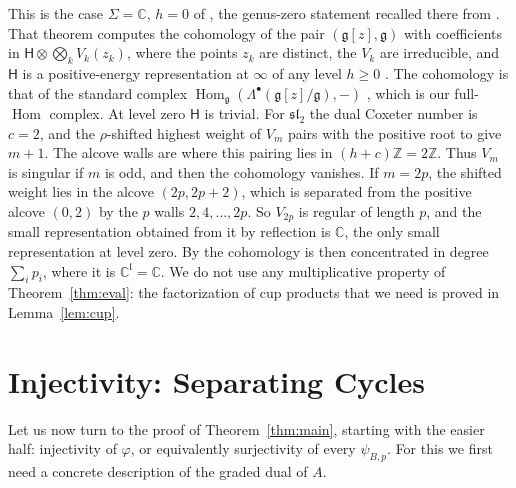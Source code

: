 \documentclass[11pt]{amsart}
\numberwithin{equation}{section}
\renewcommand{\S}{\mbox{$\mathsection$}}
\theoremstyle{definition}
\theoremstyle{remark}
\newcommand{\C}{\mathbb{C}}
\newcommand{\g}{\mathfrak{g}}
\newcommand{\sltwo}{\mathfrak{sl}_2}
\newcommand{\lie}{\mathfrak{l}}
\newcommand{\Hom}{\operatorname{Hom}}
\begin{document}
This is the case $\Sigma=\C$, $h=0$ of \cite[Theorem~3.1]{Tel96}, the genus-zero statement recalled there from \cite[\S1.4, Theorem~0]{Tel95}. That theorem computes the cohomology of the pair $(\g[z],\g)$ with coefficients in $\mathsf H\otimes\bigotimes_kV_k(z_k)$, where the points $z_k$ are distinct, the $V_k$ are irreducible, and $\mathsf H$ is a positive-energy representation at $\infty$ of any level $h\ge0$ \cite[\S1]{Tel96}. The cohomology is that of the standard complex $\Hom_\g(\Lambda^\bullet(\g[z]/\g),-)$ \cite[(3.1.4)]{Tel95}, which is our full-$\Hom$ complex. At level zero $\mathsf H$ is trivial. For $\sltwo$ the dual Coxeter number is $c=2$, and the $\rho$-shifted highest weight of $V_m$ pairs with the positive root to give $m+1$. The alcove walls are where this pairing lies in $(h+c)\mathbb Z=2\mathbb Z$. Thus $V_m$ is singular if $m$ is odd, and then the cohomology vanishes. If $m=2p$, the shifted weight lies in the alcove $(2p,2p+2)$, which is separated from the positive alcove $(0,2)$ by the $p$ walls $2,4,\dots,2p$. So $V_{2p}$ is regular of length $p$, and the small representation obtained from it by reflection \cite[\S2]{Tel96} is $\C$, the only small representation at level zero. By \cite[Theorem~3.1]{Tel96} the cohomology is then concentrated in degree $\sum_ip_i$, where it is $\C^{\lie}=\C$. We do not use any multiplicative property of Theorem~\ref{thm:eval}: the factorization of cup products that we need is proved in Lemma~\ref{lem:cup}.

\section{Injectivity: Separating Cycles}\label{sec:injective}

Let us now turn to the proof of Theorem~\ref{thm:main}, starting with the easier half: injectivity of $\varphi$, or equivalently surjectivity of every $\psi_{B,p}$. For this we first need a concrete description of the graded dual of $A$.
\end{document}
